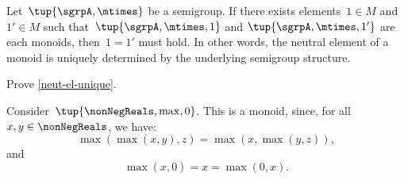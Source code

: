 \begin{lemma}
  \label{neut-el-unique}
  Let~$\tup{\sgrpA, \mtimes}$ be a semigroup. If there exists elements~$1 \in M$ and~$1' \in M$ such that~$\tup{\sgrpA, \mtimes, 1}$ and $\tup{\sgrpA, \mtimes, 1'}$ are each monoids, then~$1 = 1'$ must hold.
  In other words, the neutral element of a monoid is uniquely determined by the underlying semigroup structure.
\end{lemma}

\begin{exercise}
  Prove \cref{neut-el-unique}.
\end{exercise}
\begin{solution}
\end{solution}



\begin{example}
  Consider~$\tup{\nonNegReals,\max,0}$. This is a monoid, since, for all~$x,y\in \nonNegReals$, we have:
  \begin{equation*}
    \max(\max(x,y),z)=\max(x,\max(y,z)),
  \end{equation*}
  and
  \begin{equation*}
    \max(x,0)=x=\max(0,x).
  \end{equation*}
\end{example}




